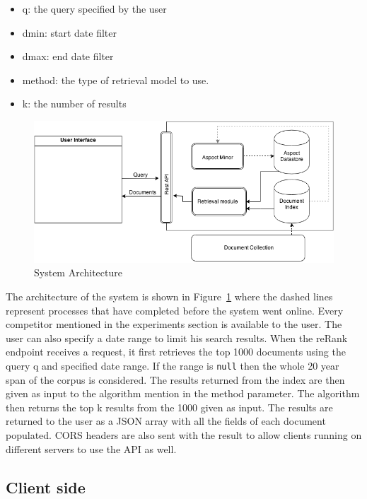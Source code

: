 \begin{itemize}
	\item q: the query specified by the user
	\item dmin: start date filter
	\item dmax: end date filter
	\item method: the type of retrieval model to use.
	\item k: the number of results
\end{itemize}

\begin{figure}[!h]
\centering
\includegraphics[width=0.9\columnwidth]{images/architecture.png}
\caption{System Architecture}
\label{fig:sysarc}
\end{figure}

The architecture of the system is shown in Figure~\ref{fig:sysarc} where the dashed lines represent processes that have completed before the system went online. Every competitor mentioned in the experiments section is available to the user. The user can also specify a date range to limit his search results. When the reRank endpoint receives a request, it first retrieves the top 1000 documents using the query q and specified date range. If the range is \texttt{null} then the whole 20 year span of the corpus is considered. The results returned from the index are then given as input to the algorithm mention in the method parameter. The algorithm then returns the top k results from the 1000 given as input. The results are returned to the user as a JSON array with all the fields of each document populated. CORS headers are also sent with the result to allow clients running on different servers to use the API as well.

\subsection{Client side} %
\label{sub:client_side}

